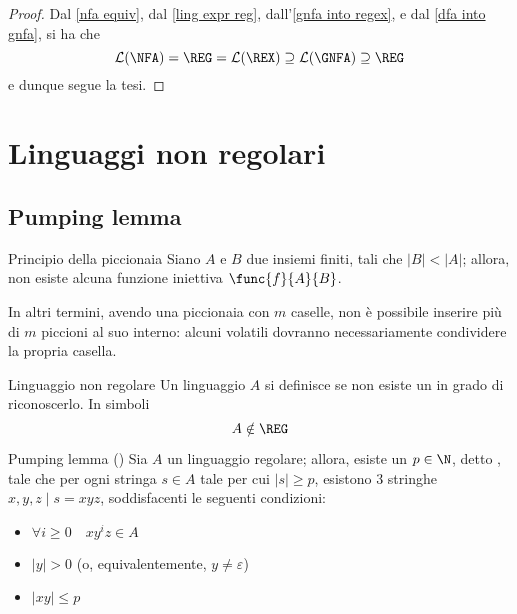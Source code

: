 \documentclass[a4paper, 12pt]{report}
\begin{document}
    \begin{proof}
        Dal \cref{nfa equiv}, dal \cref{ling expr reg}, dall'\cref{gnfa into regex}, e dal \cref{dfa into gnfa}, si ha che $$\mathcal{L}(\NFA) = \mathrm{\REG} = \mathcal{L}(\REX) \supseteq \mathcal{L}(\mathrm{\GNFA}) \supseteq \mathrm{\REG}$$ e dunque segue la tesi.
    \end{proof}

    \section{Linguaggi non regolari}

    \subsection{Pumping lemma}

    \begin{framedprinc}[label={pigeonhole}]{Principio della piccionaia}
        Siano $A$ e $B$ due insiemi finiti, tali che $|B| < |A|$; allora, non esiste alcuna funzione iniettiva $\func{f}{A}{B}$.

        In altri termini, avendo una piccionaia con $m$ caselle, non è possibile inserire più di $m$ piccioni al suo interno: alcuni volatili dovranno necessariamente condividere la propria casella.
    \end{framedprinc}
    
    \begin{frameddefn}{Linguaggio non regolare}
        Un linguaggio $A$ si definisce  se non esiste un \DFA in grado di riconoscerlo. In simboli $$A \notin \mathrm{\REG}$$
    \end{frameddefn}

    \begin{framedlem}[label={pumping reg}]{Pumping lemma (\REG)}
        Sia $A$ un linguaggio regolare; allora, esiste un $p \in \N$, detto , tale che per ogni stringa $s \in A$ tale per cui $|s| \ge p$, esistono 3 stringhe $x, y, z \mid s = xyz$, soddisfacenti le seguenti condizioni:

        \begin{itemize}
            \item $\forall i \ge 0 \quad xy^iz \in A$
            \item $|y| > 0$ (o, equivalentemente, $y \neq \varepsilon$)
            \item $|xy| \le p$
        \end{itemize}
    \end{framedlem}
\end{document}
